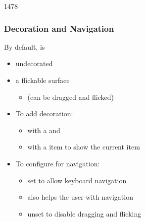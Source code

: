 \begin{slide}{1478}\frametitle{Decoration and Navigation}


By default,  is
\begin{itemize}
\item undecorated
\item a flickable surface
  \begin{itemize}
  \item (can be dragged and flicked)
  \end{itemize}
\end{itemize}\medskip

\begin{itemize}
\item To add decoration:
  \begin{itemize}
  \item with a  and 
  \item with a  item to show the current item
  \end{itemize}

\medskip
\item To configure for navigation:
  \begin{itemize}
  \item set  to allow keyboard navigation
  \item {} also helps the user with navigation
  \item unset  to disable dragging and flicking
  \end{itemize}
\end{itemize}

\vspace*{0.5em}

\end{slide}


